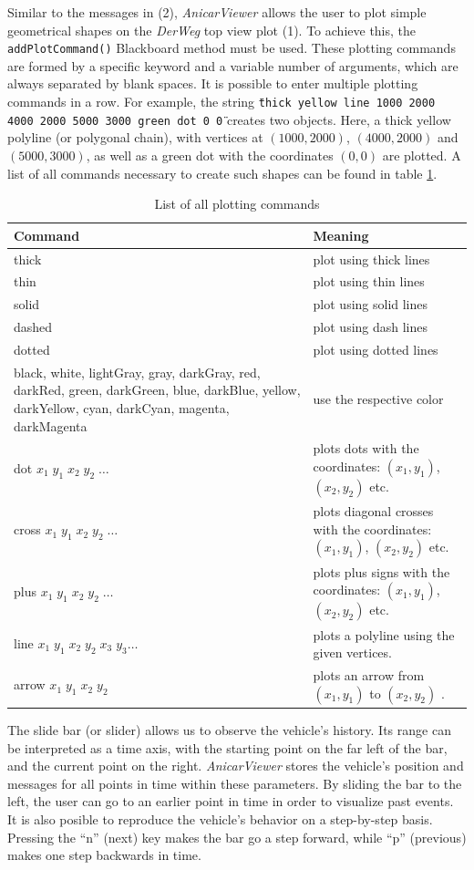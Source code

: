 \documentclass[a4paper, 11pt]{article}
\newcommand{\code}[1]{\texttt{#1}}
\newcommand{\DerWeg}{\textit{DerWeg }} %
\newcommand{\AnicarViewer}{\textit{AnicarViewer }} %
\begin{document}
Similar to the messages in (2), \AnicarViewer allows the user to plot simple geometrical shapes on the \DerWeg top view plot (1). To achieve this, the \code{addPlotCommand()} Blackboard method must be used. These plotting commands are formed by a specific keyword and a variable number of arguments, which are always separated by blank spaces. It is possible to enter multiple plotting commands in a row. For example, the string \texttt{\"{}thick yellow line 1000 2000 4000 2000 5000 3000 green dot 0 0\"{}} creates two objects. Here, a thick yellow polyline (or polygonal chain), with vertices at $(1000, 2000)$, $(4000,2000)$ and $(5000,3000)$, as well as a green dot with the coordinates $(0,0)$ are plotted. A list of all commands necessary to create such shapes can be found in table \ref{tab:plotcmd}.

\begin{table}
\centering
\begin{tabular}{|p{7cm}|p{8cm}|}
\hline
Command & Meaning \\
\hline
thick & plot using thick lines \\
thin & plot using thin lines \\
\hline
solid & plot using solid lines \\
dashed & plot using dash lines \\
dotted & plot using dotted lines \\
\hline
black, white, lightGray, gray, darkGray, red, darkRed, green, darkGreen, blue, darkBlue, yellow, darkYellow, cyan, darkCyan, magenta, darkMagenta & use the respective color \\
\hline
dot $x_1\;y_1\;x_2\;y_2\;\dots$ & plots dots with the coordinates: $(x_1,y_1)$, $(x_2,y_2)$ etc. \\
cross $x_1\;y_1\;x_2\;y_2\;\dots$ & plots diagonal crosses with the coordinates: $(x_1,y_1)$, $(x_2,y_2)$ etc. \\
plus $x_1\;y_1\;x_2\;y_2\;\dots$ & plots plus signs with the coordinates: $(x_1,y_1)$, $(x_2,y_2)$ etc. \\
line $x_1\;y_1\;x_2\;y_2\;x_3\;y_3\dots$ & plots a polyline using the given vertices. \\
arrow $x_1\;y_1\;x_2\;y_2$ & plots an arrow from $(x_1,y_1)$ to $(x_2,y_2)$ . \\
\hline
\end{tabular}
\caption{List of all plotting commands}
\label{tab:plotcmd}
\end{table}

The slide bar (or slider) allows us to observe the vehicle's history. Its range can be interpreted as a time axis, with the starting point on the far left of the bar, and the current point on the right. \AnicarViewer stores the vehicle's position and messages for all points in time within these parameters. By sliding the bar to the left, the user can go to an earlier point in time in order to visualize past events. It is also posible to reproduce the vehicle's behavior on a step-by-step basis. Pressing the "`n"' (next) key makes the bar go a step forward, while "`p"' (previous) makes one step backwards in time.
\end{document}
